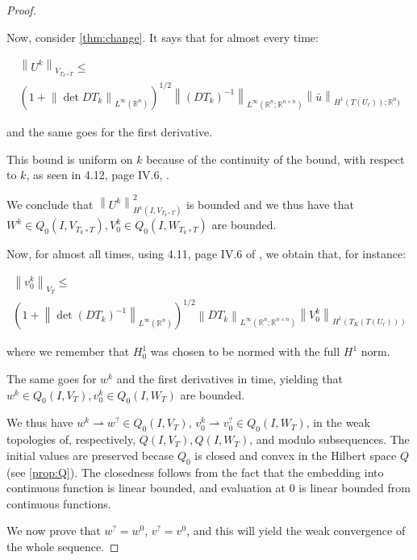 \documentclass[english,a4paper,10pt,oneside]{scrbook}	%
\theoremstyle{break}
\newenvironment{mproof}[1][\proofname]{%
  \begin{proof}[#1]$ $\par\nobreak\ignorespaces
}{%
  \end{proof}
}
\renewcommand*{\proofname}{Proof}
\theoremstyle{remark}
\newcommand{\mR}{\mathbb{R}}
\newcommand{\norm}[1]{\left\lVert#1\right\rVert}
\newcommand{\te}{\theta}
\newcommand{\weakc}{\rightharpoonup}
\begin{document}
\begin{mproof}
Now, consider \ref{thm:change}. It says that for almost every time:

\begin{align*}
\norm{U^k}_{V_{T_k\circ T}}\leq\\ \left ( 1+\norm{\det DT_k}_{L^\infty(\mR^n)}\right)^{1/2} \norm{(DT_k)^{-1}}_{L^\infty(\mR^n;\mR^{n\times n})}\norm{\bar{u}}_{H^1(T(U_r));\mR^n)}
\end{align*}

and the same goes for the first derivative. 



This bound is uniform on $k$ because of the continuity of the bound, with respect to $k$, as seen in 4.12, page IV.6, \cite{murat}.

We conclude that $\norm{U^k}_{H^1(I,V_{T_k\circ T})}^2$ is bounded and we thus have that $W^k \in Q_0(I, V_{T_k\circ T}), V_0^k \in Q_0(I,W_{T_k\circ T})$ are bounded.

Now, for almost all times, using 4.11, page IV.6 of \cite{murat}, we obtain that, for instance:

\begin{align*}
\norm{v_0^k}_{V_{ T}}\leq \\\left ( 1+\norm{\det (DT_k)^{-1}}_{L^\infty(\mR^n)}\right)^{1/2} \norm{DT_k}_{L^\infty(\mR^n;\mR^{n\times n})}\norm{V_0^k}_{H^1(T_K(T(U_r)))}
\end{align*}

where we remember that $H^1_0$ was chosen to be normed with the full $H^1$ norm.

The same goes for $w^k$ and the first derivatives in time, yielding that $w^k \in Q_0(I, V_{ T}), v_0^k \in Q_0(I,W_{T})$ are bounded.

We thus have $w^k\weakc w^? \in Q_0(I, V_{ T})$, $v_0^k \weakc v_0^? \in Q_0(I,W_{T})$, in the weak topologies of, respectively, $Q(I, V_{ T}), Q(I,W_{T})$, and modulo subsequences. The initial values are preserved becase $Q_0$ is closed and convex in the Hilbert space $Q$ (see \ref{prop:Q}). The closedness follows from the fact that the embedding into continuous function is linear bounded, and evaluation at $0$ is linear bounded from continuous functions.

We now prove that $w^?=w^0$, $v^?=v^0$, and this will yield the weak convergence of the whole sequence.


\end{mproof}
\end{document}
